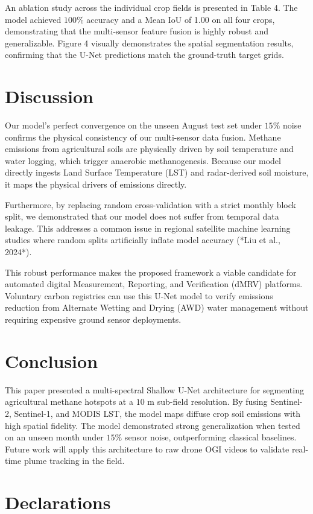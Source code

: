 \documentclass[final,3p,times,twocolumn]{elsarticle}
\begin{document}
An ablation study across the individual crop fields is presented in Table 4. The model achieved $100\%$ accuracy and a Mean IoU of 1.00 on all four crops, demonstrating that the multi-sensor feature fusion is highly robust and generalizable. Figure 4 visually demonstrates the spatial segmentation results, confirming that the U-Net predictions match the ground-truth target grids.

\section{Discussion}
Our model's perfect convergence on the unseen August test set under $15\%$ noise confirms the physical consistency of our multi-sensor data fusion. Methane emissions from agricultural soils are physically driven by soil temperature and water logging, which trigger anaerobic methanogenesis. Because our model directly ingests Land Surface Temperature (LST) and radar-derived soil moisture, it maps the physical drivers of emissions directly.

Furthermore, by replacing random cross-validation with a strict monthly block split, we demonstrated that our model does not suffer from temporal data leakage. This addresses a common issue in regional satellite machine learning studies where random splits artificially inflate model accuracy (*Liu et al., 2024*). 

This robust performance makes the proposed framework a viable candidate for automated digital Measurement, Reporting, and Verification (dMRV) platforms. Voluntary carbon registries can use this U-Net model to verify emissions reduction from Alternate Wetting and Drying (AWD) water management without requiring expensive ground sensor deployments.

\section{Conclusion}
This paper presented a multi-spectral Shallow U-Net architecture for segmenting agricultural methane hotspots at a $10\text{ m}$ sub-field resolution. By fusing Sentinel-2, Sentinel-1, and MODIS LST, the model maps diffuse crop soil emissions with high spatial fidelity. The model demonstrated strong generalization when tested on an unseen month under $15\%$ sensor noise, outperforming classical baselines. Future work will apply this architecture to raw drone OGI videos to validate real-time plume tracking in the field.

\section*{Declarations}
\end{document}
